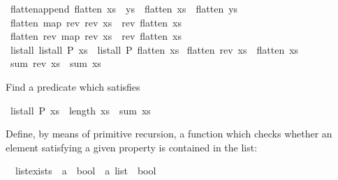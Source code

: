 \begin{isabellebody}
\isanewline
\isamarkupfalse%
\ flatten{\isacharunderscore}append{\isacharcolon}\ {\isachardoublequote}flatten\ {\isacharparenleft}xs\ {\isacharat}\ ys{\isacharparenright}\ {\isacharequal}\ flatten\ xs\ {\isacharat}\ flatten\ ys{\isachardoublequote}\isamarkupfalse%
\isanewline
\isamarkupfalse%
\ {\isachardoublequote}flatten\ {\isacharparenleft}map\ rev\ {\isacharparenleft}rev\ xs{\isacharparenright}{\isacharparenright}\ {\isacharequal}\ rev\ {\isacharparenleft}flatten\ xs{\isacharparenright}{\isachardoublequote}\isamarkupfalse%
\isanewline
\isamarkupfalse%
\ {\isachardoublequote}flatten\ {\isacharparenleft}rev\ {\isacharparenleft}map\ rev\ xs{\isacharparenright}{\isacharparenright}\ {\isacharequal}\ rev\ {\isacharparenleft}flatten\ xs{\isacharparenright}{\isachardoublequote}\isamarkupfalse%
\isanewline
\isamarkupfalse%
\ {\isachardoublequote}list{\isacharunderscore}all\ {\isacharparenleft}list{\isacharunderscore}all\ P{\isacharparenright}\ xs\ {\isacharequal}\ list{\isacharunderscore}all\ P\ {\isacharparenleft}flatten\ xs{\isacharparenright}{\isachardoublequote}\isamarkupfalse%
\isanewline
\isamarkupfalse%
\ {\isachardoublequote}flatten\ {\isacharparenleft}rev\ xs{\isacharparenright}\ {\isacharequal}\ flatten\ xs{\isachardoublequote}\isamarkupfalse%
\isanewline
\isamarkupfalse%
\ {\isachardoublequote}sum\ {\isacharparenleft}rev\ xs{\isacharparenright}\ {\isacharequal}\ sum\ xs{\isachardoublequote}\isamarkupfalse%
\isamarkupfalse%
%
\begin{isamarkuptext}%
Find a predicate  which satisfies%
\end{isamarkuptext}%
\isamarkuptrue%
\ {\isachardoublequote}list{\isacharunderscore}all\ P\ xs\ {\isasymlongrightarrow}\ length\ xs\ {\isasymle}\ sum\ xs{\isachardoublequote}\isamarkupfalse%
\isamarkupfalse%
%
\begin{isamarkuptext}%
Define, by means of primitive recursion, a function  which checks whether an element satisfying a given property is
contained in the list:%
\end{isamarkuptext}%
\isamarkuptrue%
\ \ list{\isacharunderscore}exists\ {\isacharcolon}{\isacharcolon}\ {\isachardoublequote}{\isacharparenleft}{\isacharprime}a\ {\isasymRightarrow}\ bool{\isacharparenright}\ {\isasymRightarrow}\ {\isacharparenleft}{\isacharprime}a\ list\ {\isasymRightarrow}\ bool{\isacharparenright}{\isachardoublequote}\isamarkupfalse%
%
\begin{isamarkuptext}%

\end{isamarkuptext}
\end{isabellebody}
